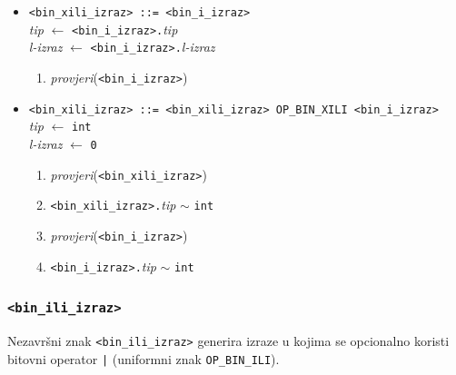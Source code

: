 \documentclass[times, 12pt, utf8]{book}
\begin{document}
\begin{itemize}

\item
\verb|<bin_xili_izraz> ::= <bin_i_izraz>|\\
\emph{tip} \(\leftarrow\) \verb|<bin_i_izraz>.|\emph{tip}\\
\emph{l-izraz} \(\leftarrow\) \verb|<bin_i_izraz>.|\emph{l-izraz}
\begin{enumerate}
\item
\emph{provjeri}(\verb|<bin_i_izraz>|)
\end{enumerate}

\item
\verb#<bin_xili_izraz> ::= <bin_xili_izraz> OP_BIN_XILI <bin_i_izraz>#\\
\emph{tip} \(\leftarrow\) \verb|int|\\
\emph{l-izraz} \(\leftarrow\) \verb|0|
\begin{enumerate}
\item
\emph{provjeri}(\verb|<bin_xili_izraz>|)
\item
\verb|<bin_xili_izraz>.|\emph{tip} \(\sim\) \verb|int|
\item
\emph{provjeri}(\verb|<bin_i_izraz>|)
\item
\verb|<bin_i_izraz>.|\emph{tip} \(\sim\) \verb|int|
\end{enumerate}

\end{itemize}

\subsubsection{\texttt{<bin\_ili\_izraz>}}

Nezavršni znak \verb|<bin_ili_izraz>| generira izraze u kojima se opcionalno koristi bitovni operator \verb#|# (uniformni znak \verb|OP_BIN_ILI|).
\end{document}
